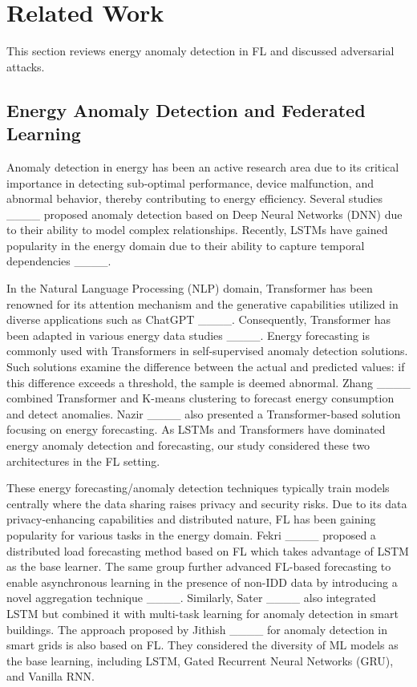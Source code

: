 \section{Related Work}
\label{sec:relatedwork}
\vspace{-0.02in}
This section reviews energy anomaly detection in FL and discussed adversarial attacks.

\subsection{Energy Anomaly Detection and Federated Learning}
\label{sub_sec:AnomalyFL}

Anomaly detection in energy has been an active research area due to its critical importance in detecting sub-optimal performance, device malfunction, and abnormal behavior, thereby contributing to energy efficiency. Several studies  ____ proposed anomaly detection based on Deep Neural Networks (DNN) due to their ability to model complex relationships. Recently, LSTMs have gained popularity in the energy domain due to their ability to capture temporal dependencies ____. 

In the Natural Language Processing (NLP) domain, Transformer has been renowned for its attention mechanism and the generative capabilities utilized in diverse applications such as ChatGPT ____. Consequently, Transformer has been adapted in various energy data studies ____. Energy forecasting is commonly used with Transformers in self-supervised anomaly detection solutions. Such solutions examine the difference between the actual and predicted values: if this difference exceeds a threshold, the sample is deemed abnormal. Zhang \etal ____ combined Transformer and K-means clustering to forecast energy consumption and detect anomalies. Nazir \etal ____ also presented a Transformer-based solution focusing on energy forecasting. As LSTMs and Transformers have dominated energy anomaly detection and forecasting, our study considered these two architectures in the FL setting. 

These energy forecasting/anomaly detection techniques typically train models centrally where the data sharing raises privacy and security risks. Due to its data privacy-enhancing capabilities and distributed nature, FL has been gaining popularity for various tasks in the energy domain. Fekri \etal ____ proposed a distributed load forecasting method based on FL which takes advantage of LSTM as the base learner. The same group further advanced FL-based forecasting to enable asynchronous learning in the presence of non-IDD data by introducing a novel aggregation technique ____. Similarly, Sater \etal ____ also integrated LSTM but combined it with multi-task learning for anomaly detection in smart buildings. The approach proposed by Jithish \etal ____ for anomaly detection in smart grids is also based on FL. They considered the diversity of ML models as the base learning, including LSTM, Gated Recurrent Neural Networks (GRU), and Vanilla RNN. 


